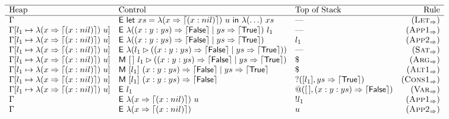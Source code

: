 \begin{figure*}
\[
  \begin{array}{lllr}
    \hline
    \text{Heap}                             & \text{Control}                                             & \text{Top of Stack}                        & \text{Rule}            \\
    \hline
    \Gamma                                  & \eval{\llet{xs = \app{\singlePMC}{u}}{\app{\lambda(\ldots)}{xs}}} & \text{---}                                 & (\smallrule{Let})      \\
    \Gamma[l_1 \mapsto \app{\singlePMC}{u}]
                                            & \eval{\app{\lambda(\isShortBody)}{l_1}}                                 & \text{---}                                 & (\smallrule{App1})     \\
    \Gamma[l_1 \mapsto \app{\singlePMC}{u}] & \eval{\lambda(\isShortBody)}                                            & l_1                                        & (\smallrule{App2})     \\
    \Gamma[l_1 \mapsto \app{\singlePMC}{u}] & \eval{\abstr{(\matcharg{l_1}{(\isShortBody)}})}              & \text{---}                                 & (\smallrule{Sat})      \\
    \Gamma[l_1 \mapsto \app{\singlePMC}{u}] & \match{[\,]}{\matcharg{l_1}{(\isShortBody)}}                 & \$                                         & (\smallrule{Arg})      \\
    \Gamma[l_1 \mapsto \app{\singlePMC}{u}] & \match{[l_1]}{\isShortBody}                                & \$                                         & (\smallrule{Alt1})     \\
    \Gamma[l_1 \mapsto \app{\singlePMC}{u}] & \match{[l_1]}{\matchpat{(x : y : ys)}{\retFalse}}          & ?([l_1],\matchpat{ys}{\retTrue})           & (\smallrule{Cons1})    \\
    \Gamma[l_1 \mapsto \app{\singlePMC}{u}] & \eval{l_1}                                                 & @([\,],\matchpat{(x : y : ys)}{\retFalse}) & (\smallrule{Var})      \\
    \Gamma                                  & \eval{\app{\singlePMC}{u}}                                 & !l_1                                       & (\smallrule{App1})     \\
    \Gamma                                  & \eval{\singlePMC}                                          & u                                          & (\smallrule{App2})     \\

\end{array}\]
\end{figure*}
